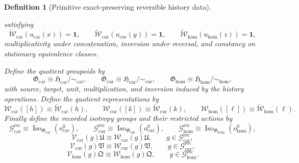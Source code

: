 \documentclass[11pt]{article}
\newcommand{\RootTensor}{\mathfrak U}
\newcommand{\RootRelabel}{\mathfrak V}
\newcommand{\RootFree}{\mathfrak Q}
\newcommand{\TensorReconGroup}{\mathcal G_{\mathrm{car}}^{\mathrm{rec}}}
\newcommand{\CurReconGroup}{\mathcal G_{\mathrm{cur}}^{\mathrm{rec}}}
\newcommand{\HomReconGroup}{\mathcal G_{\mathrm{hom}}^{\mathrm{rec}}}
\newcommand{\TensorReconAct}{\mathscr V_{\mathrm{car}}}
\newcommand{\CurReconAct}{\mathscr V_{\mathrm{cur}}}
\newcommand{\HomReconAct}{\mathscr V_{\mathrm{hom}}}
\newcommand{\TensorGroupoid}{\mathfrak G_{\mathrm{car}}}
\newcommand{\CurGroupoid}{\mathfrak G_{\mathrm{cur}}}
\newcommand{\HomGroupoid}{\mathfrak G_{\mathrm{hom}}}
\newcommand{\TensorObjBase}{o_{\mathrm{car}}^0}
\newcommand{\CurObjBase}{o_{\mathrm{cur}}^0}
\newcommand{\HomObjBase}{o_{\mathrm{hom}}^0}
\newcommand{\TensorGroupoidRep}{\mathscr W_{\mathrm{car}}}
\newcommand{\CurGroupoidRep}{\mathscr W_{\mathrm{cur}}}
\newcommand{\HomGroupoidRep}{\mathscr W_{\mathrm{hom}}}
\newcommand{\TensorHistoryClass}{\mathfrak H_{\mathrm{car}}}
\newcommand{\CurHistoryClass}{\mathfrak H_{\mathrm{cur}}}
\newcommand{\HomHistoryClass}{\mathfrak H_{\mathrm{hom}}}
\newcommand{\TensorHistoryRep}{\widetilde{\mathscr W}_{\mathrm{car}}}
\newcommand{\CurHistoryRep}{\widetilde{\mathscr W}_{\mathrm{cur}}}
\newcommand{\HomHistoryRep}{\widetilde{\mathscr W}_{\mathrm{hom}}}
\newcommand{\Iso}{\operatorname{Iso}}
\newtheorem{definition}{Definition}
\begin{document}
\begin{definition}[Primitive exact-preserving reversible history data]
\begin{enumerate}
\[    \]
    satisfying
    \[
    \TensorHistoryRep(u_{\mathrm{car}}(x))=\mathbf 1,\qquad
    \CurHistoryRep(u_{\mathrm{cur}}(y))=\mathbf 1,\qquad
    \HomHistoryRep(u_{\mathrm{hom}}(z))=\mathbf 1,
    \]
    multiplicativity under concatenation, inversion under reversal, and constancy on stationary equivalence classes.
\end{enumerate}
Define the quotient groupoids by
\begin{equation}
\TensorGroupoid\equiv\TensorHistoryClass/\!\sim_{\mathrm{car}},
\qquad
\CurGroupoid\equiv\CurHistoryClass/\!\sim_{\mathrm{cur}},
\qquad
\HomGroupoid\equiv\HomHistoryClass/\!\sim_{\mathrm{hom}},
\label{eq:groupoid_from_history_quotient}
\end{equation}
with source, target, unit, multiplication, and inversion induced by the history operations. Define the quotient representations by
\begin{equation}
\TensorGroupoidRep([h])\equiv\TensorHistoryRep(h),\qquad
\CurGroupoidRep([k])\equiv\CurHistoryRep(k),\qquad
\HomGroupoidRep([\ell])\equiv\HomHistoryRep(\ell).
\label{eq:groupoid_rep_from_history}
\end{equation}
Finally define the recorded isotropy groups and their restricted actions by
\begin{equation}
\TensorReconGroup\equiv\Iso_{\TensorGroupoid}(\TensorObjBase),\qquad
\CurReconGroup\equiv\Iso_{\CurGroupoid}(\CurObjBase),\qquad
\HomReconGroup\equiv\Iso_{\HomGroupoid}(\HomObjBase),
\label{eq:isotropy_from_history}
\end{equation}
\begin{equation}
\TensorReconAct(g)\RootTensor\equiv\TensorGroupoidRep(g)\RootTensor,
\qquad
g\in\TensorReconGroup,
\label{eq:history_recon_action_car}
\end{equation}
\begin{equation}
\CurReconAct(g)\RootRelabel\equiv\CurGroupoidRep(g)\RootRelabel,
\qquad
g\in\CurReconGroup,
\label{eq:history_recon_action_cur}
\end{equation}
\begin{equation}
\HomReconAct(g)\RootFree\equiv\HomGroupoidRep(g)\RootFree,
\qquad
g\in\HomReconGroup.
\label{eq:history_recon_action_hom}
\end{equation}
\end{definition}
\end{document}
